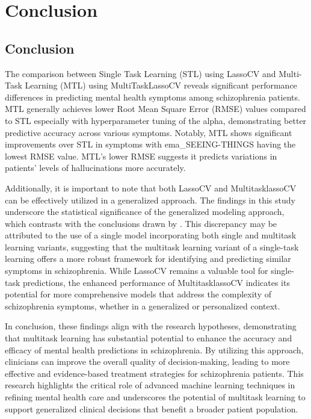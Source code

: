 \def\baselinestretch{1}

\chapter{Conclusion}

\def\baselinestretch{1.66}




\goodbreak
\section{Conclusion}
The comparison between Single Task Learning (STL) using LassoCV and Multi-Task Learning (MTL) using MultiTaskLassoCV reveals significant performance differences in predicting mental health symptoms among schizophrenia patients.  MTL generally achieves lower Root Mean Square Error (RMSE) values compared to STL especially with hyperparameter tuning of the alpha, demonstrating better predictive accuracy across various symptoms. Notably, MTL shows significant improvements over STL in symptoms with ema\_SEEING-THINGS having the lowest RMSE value. MTL's lower RMSE suggests it predicts variations in patients' levels of hallucinations more accurately.


Additionally, it is important to note that both LassoCV and MultitasklassoCV can be effectively utilized in a generalized approach. The findings in this study underscore the statistical significance of the generalized modeling approach, which contrasts with the conclusions drawn by \citet{tseng2020using}. This discrepancy may be attributed to the use of a single model incorporating both single and multitask learning variants, suggesting that the multitask learning variant of a single-task learning offers a more robust framework for identifying and predicting similar symptoms in schizophrenia. While LassoCV remains a valuable tool for single-task predictions, the enhanced performance of MultitasklassoCV indicates its potential for more comprehensive models that address the complexity of schizophrenia symptoms, whether in a generalized or personalized context.

In conclusion, these findings align with the research hypotheses, demonstrating that multitask learning has substantial potential to enhance the accuracy and efficacy of mental health predictions in schizophrenia. By utilizing this approach, clinicians can improve the overall quality of decision-making, leading to more effective and evidence-based treatment strategies for schizophrenia patients. This research highlights the critical role of advanced machine learning techniques in refining mental health care and underscores the potential of multitask learning to support generalized clinical decisions that benefit a broader patient population.

